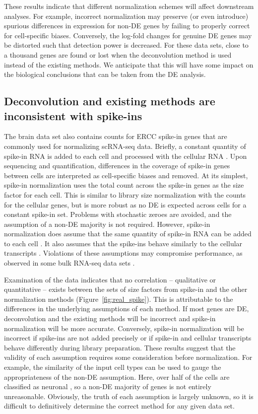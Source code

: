 \documentclass{article}
\begin{document}
These results indicate that different normalization schemes will affect downstream analyses.
For example, incorrect normalization may preserve (or even introduce) spurious differences in expression for non-DE genes by failing to properly correct for cell-specific biases.
Conversely, the log-fold changes for genuine DE genes may be distorted such that detection power is decreased.
For these data sets, close to a thousand genes are found or lost when the deconvolution method is used instead of the existing methods.
We anticipate that this will have some impact on the biological conclusions that can be taken from the DE analysis.

\subsection{Deconvolution and existing methods are inconsistent with spike-ins}
The brain data set also contains counts for ERCC spike-in genes that are commonly used for normalizing scRNA-seq data.
Briefly, a constant quantity of spike-in RNA is added to each cell and processed with the cellular RNA \cite{stegle2015computational}.
Upon sequencing and quantification, differences in the coverage of spike-in genes between cells are interpreted as cell-specific biases and removed.
At its simplest, spike-in normalization uses the total count across the spike-in genes as the size factor for each cell.
This is similar to library size normalization with the counts for the cellular genes, but is more robust as no DE is expected across cells for a constant spike-in set.
Problems with stochastic zeroes are avoided, and the assumption of a non-DE majority is not required.
However, spike-in normalization does assume that the same quantity of spike-in RNA can be added to each cell \cite{robinson2010scaling,marinov2014singlecell}.
It also assumes that the spike-ins behave similarly to the cellular transcripts \cite{grun2015design}.
Violations of these assumptions may compromise performance, as observed in some bulk RNA-seq data sets \cite{risso2014normalization}.

Examination of the data indicates that no correlation -- qualitative or quantitative -- 
    exists between the sets of size factors from spike-in and the other normalization methods (Figure~\ref{fig:real_spike}).
This is attributable to the differences in the underlying assumptions of each method.
If most genes are DE, deconvolution and the existing methods will be incorrect and spike-in normalization will be more accurate.
Conversely, spike-in normalization will be incorrect if spike-ins are not added precisely or if spike-in and cellular transcripts behave differently during library preparation.
These results suggest that the validity of each assumption requires some consideration before normalization.
For example, the similarity of the input cell types can be used to gauge the appropriateness of the non-DE assumption. 
Here, over half of the cells are classified as neuronal \cite{zeisel2015brain}, so a non-DE majority of genes is not entirely unreasonable.
Obviously, the truth of each assumption is largely unknown, so it is difficult to definitively determine the correct method for any given data set.
\end{document}

